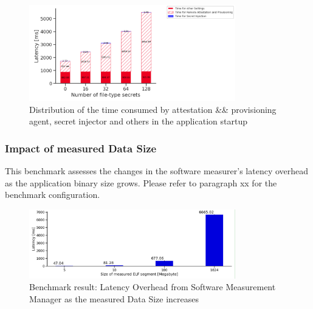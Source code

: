 \begin{figure}[H]
    \centering
    \includegraphics[width=0.8\textwidth]{images/startup_time_change_as_file_type_secret_increasing.PNG}
    \caption[Distribution of the time consumed by attestation \&\& provisioning agent, secret injector and others in the application startup]{Distribution of the time consumed by attestation \&\& provisioning agent, secret injector and others in the application startup}
    \label{fig:startup_time_change_as_file_type_secret_increasing}
\end{figure}



\subsubsection{Impact of measured Data Size}
This benchmark assesses the changes in the software measurer's latency overhead as the application binary size grows. Please refer to paragraph xx for the benchmark configuration.

\begin{figure}[H]
    \centering
    \includegraphics[width=0.8\textwidth]{images/overhead_software_measurement_manager_as_elf_size_increasing.PNG}
    \caption[Benchmark result: Latency Overhead from Software Measurement Manager as the measured Data Size increases]{Benchmark result: Latency Overhead from Software Measurement Manager as the measured Data Size increases}
    \label{fig:overhead_software_measurement_manager_as_elf_size_increasing}
\end{figure}


